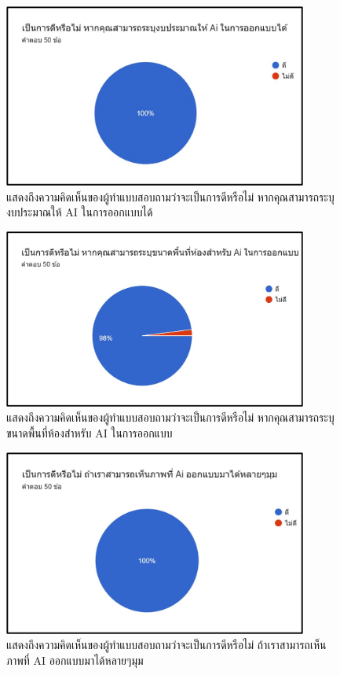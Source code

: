 \documentclass[12pt,oneside,openright,a4paper]{cpe-thai-project}
\begin{document}
\begin{figure}[!h]\centering
\includegraphics[width=10cm]{image/requirement-5.jpg}
\caption{แสดงถึงความคิดเห็นของผู้ทำแบบสอบถามว่าจะเป็นการดีหรือไม่ หากคุณสามารถระบุงบประมาณให้ AI ในการออกแบบได้}
\label{fig:requirement-5}
\end{figure}

\vspace{\fill}\clearpage

\begin{figure}[!h]\centering
\includegraphics[width=10cm]{image/requirement-6.jpg}
\caption{แสดงถึงความคิดเห็นของผู้ทำแบบสอบถามว่าจะเป็นการดีหรือไม่ หากคุณสามารถระบุขนาดพื้นที่ห้องสำหรับ AI ในการออกแบบ}
\label{fig:requirement-6}
\end{figure}

\begin{figure}[!h]\centering
\includegraphics[width=10cm]{image/requirement-7.jpg}
\caption{แสดงถึงความคิดเห็นของผู้ทำแบบสอบถามว่าจะเป็นการดีหรือไม่ ถ้าเราสามารถเห็นภาพที่ AI ออกแบบมาได้หลายๆมุม}
\label{fig:requirement-7}
\end{figure}
\end{document}
